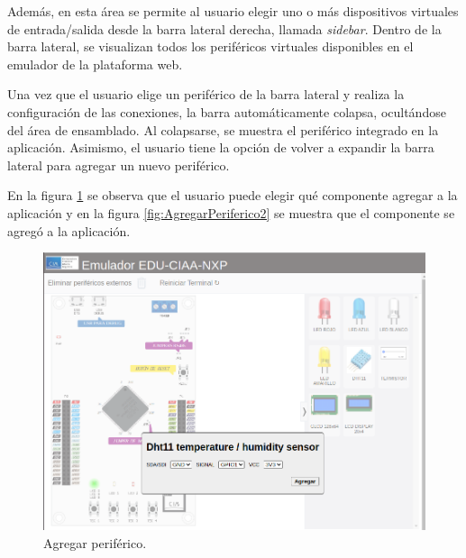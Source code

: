 Además, en esta área se permite al usuario elegir uno o más dispositivos virtuales de entrada/salida desde la barra lateral derecha, llamada \textit{sidebar}. Dentro de la barra lateral, se visualizan todos los periféricos virtuales disponibles en el emulador de la plataforma web. 

Una vez que el usuario elige un periférico de la barra lateral y realiza la configuración de las conexiones, la barra automáticamente colapsa, ocultándose del área de ensamblado. Al colapsarse, se muestra el periférico integrado en la aplicación. Asimismo,  el usuario tiene la opción de volver a expandir la barra lateral para agregar un nuevo periférico.


En la figura \ref{fig:AgregarPeriferico} se observa que el usuario puede elegir qué componente agregar a la aplicación y en la figura \ref{fig:AgregarPeriferico2} se muestra que el componente se agregó a la aplicación.
\hfill \break
\hfill \break
\hfill \break
\hfill \break
\hfill \break
\hfill \break
\hfill \break
\hfill \break
\hfill \break
\begin{figure}[ht]
	\centering
	\includegraphics[scale=.41]{./Figures/AgregarPeriferico.png}
	\caption{Agregar periférico.}
	\label{fig:AgregarPeriferico}
\end{figure}


